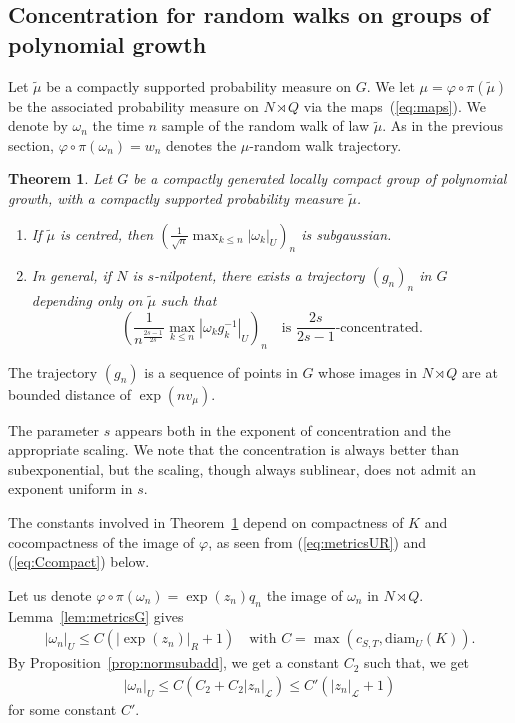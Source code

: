 \documentclass[11pt,leqno]{article}
\theoremstyle{plain}
\newtheorem{theorem}{Theorem}[section]
\theoremstyle{definition}
\theoremstyle{remark}
\numberwithin{equation}{section}
\begin{document}
\subsection{Concentration for random walks on groups of polynomial growth}

Let $\tilde{\mu}$ be a compactly supported probability measure on $G$. We let $\mu=\varphi \circ \pi (\tilde{\mu})$ be the associated probability measure on $N\rtimes Q$ via the maps~(\ref{eq:maps}). We denote by $\omega_n$ the time $n$ sample of the random walk of law $\tilde{\mu}$. As in the previous section, $\varphi\circ\pi(\omega_n)=w_n$ denotes the $\mu$-random walk trajectory.

\begin{theorem}\label{thm:wordconcentration}
Let $G$ be a compactly generated locally compact group of polynomial growth, with a compactly supported probability measure $\tilde{\mu}$.
\begin{enumerate}
\item If $\tilde{\mu}$ is centred, then $\left(\frac{1}{\sqrt{n}}\max_{k\le n} |\omega_k|_U \right)_n$ is subgaussian.
\item In general, if $N$ is $s$-nilpotent, there exists a trajectory $(g_n)_{n}$ in $G$ depending only on $\tilde{\mu}$ such that 
\[
\left( \frac{1}{n^{\frac{2s-1}{2s}}} \max_{k\le n}|\omega_kg_k^{-1}|_U \right)_n \quad \textrm{is }\frac{2s}{2s-1}\textrm{-concentrated.}
\]
\end{enumerate}
\end{theorem} 

The trajectory $(g_n)$ is a sequence of points in $G$ whose images in $N\rtimes Q$ are at bounded distance of  $\exp(nv_\mu)$.

The parameter $s$ appears both in the exponent of concentration and the appropriate scaling. We note that the concentration is always better than subexponential, but the scaling, though always sublinear, does not admit an exponent uniform in $s$.

The constants involved in Theorem~\ref{thm:wordconcentration} depend on compactness of $K$ and cocompactness of the image of $\varphi$, as seen from (\ref{eq:metricsUR}) and (\ref{eq:Ccompact}) below. 

Let us denote $\varphi\circ\pi(\omega_n)=\exp(z_n)q_n$ the image of $\omega_n$ in $N\rtimes Q$.
Lemma~\ref{lem:metricsG} gives
\begin{align}\label{eq:metricsUR}
|\omega_n|_U \le C (|\exp(z_n)|_R+1) \quad \textrm{with }C=\max(c_{S,T},\mathrm{diam}_U(K)).
\end{align}
By Proposition~\ref{prop:normsubadd}, we get a constant $C_2$ such that, we get
\begin{align}\label{eq:normsUL}
|\omega_n|_U \le C(C_2+C_2|z_n|_{\mathcal{L}}) \le C'(|z_n|_{\mathcal{L}}+1)
\end{align}
for some constant $C'$.
\end{document}
